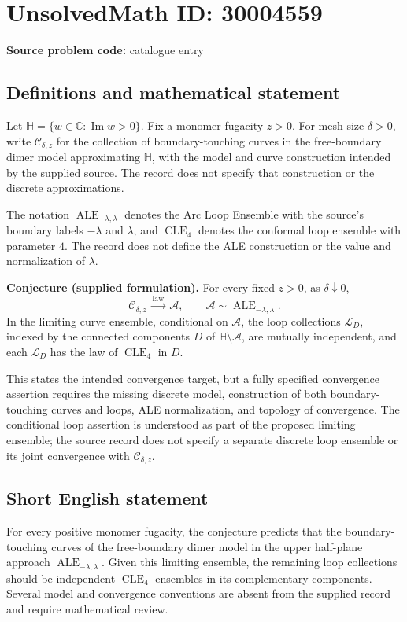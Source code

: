 \documentclass[11pt]{article}
\newcommand{\C}{\mathbb{C}}
\begin{document}
\section*{UnsolvedMath ID: 30004559}
\textbf{Source problem code:} catalogue entry
\subsection{Definitions and mathematical statement}
Let \(\mathbb H=\{w\in\C:\operatorname{Im}w>0\}\). Fix a monomer fugacity \(z>0\). For mesh size \(\delta>0\), write \(\mathcal C_{\delta,z}\) for the collection of boundary-touching curves in the free-boundary dimer model approximating \(\mathbb H\), with the model and curve construction intended by the supplied source. The record does not specify that construction or the discrete approximations.

The notation \(\operatorname{ALE}_{-\lambda,\lambda}\) denotes the Arc Loop Ensemble with the source's boundary labels \(-\lambda\) and \(\lambda\), and \(\operatorname{CLE}_4\) denotes the conformal loop ensemble with parameter \(4\). The record does not define the ALE construction or the value and normalization of \(\lambda\).

\textbf{Conjecture (supplied formulation).} For every fixed \(z>0\), as \(\delta\downarrow0\),
\[
\mathcal C_{\delta,z}\ \xrightarrow{\mathrm{law}}\ \mathcal A,
\qquad \mathcal A\sim\operatorname{ALE}_{-\lambda,\lambda}.
\]
In the limiting curve ensemble, conditional on \(\mathcal A\), the loop collections \(\mathcal L_D\), indexed by the connected components \(D\) of \(\mathbb H\setminus\mathcal A\), are mutually independent, and each \(\mathcal L_D\) has the law of \(\operatorname{CLE}_4\) in \(D\).

This states the intended convergence target, but a fully specified convergence assertion requires the missing discrete model, construction of both boundary-touching curves and loops, ALE normalization, and topology of convergence. The conditional loop assertion is understood as part of the proposed limiting ensemble; the source record does not specify a separate discrete loop ensemble or its joint convergence with \(\mathcal C_{\delta,z}\).
\subsection{Short English statement}
For every positive monomer fugacity, the conjecture predicts that the boundary-touching curves of the free-boundary dimer model in the upper half-plane approach \(\operatorname{ALE}_{-\lambda,\lambda}\). Given this limiting ensemble, the remaining loop collections should be independent \(\operatorname{CLE}_4\) ensembles in its complementary components. Several model and convergence conventions are absent from the supplied record and require mathematical review.
\end{document}
